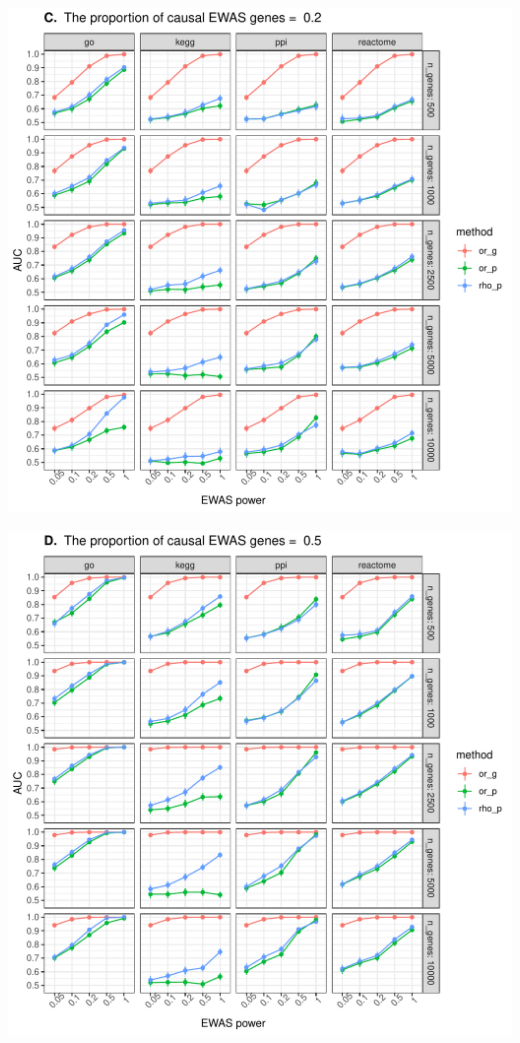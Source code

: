 \documentclass[11pt,oneside]{bristolthesis}
\begin{document}
\begin{center}\includegraphics[width=1\linewidth]{figure/06-ewas_gwas_comparison/method_test_gene_up_all/PEC_0.2} \end{center}
\begin{center}\includegraphics[width=1\linewidth]{figure/06-ewas_gwas_comparison/method_test_gene_up_all/PEC_0.5} \end{center}
\end{document}
